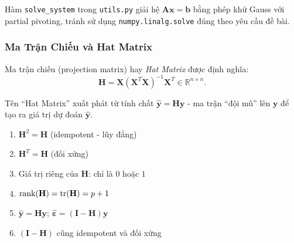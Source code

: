 Hàm \texttt{solve\_system} trong \texttt{utils.py} giải hệ $\mathbf{A}\mathbf{x}
= \mathbf{b}$ bằng phép khử Gauss với partial pivoting, tránh sử dụng
\texttt{numpy.linalg.solve} đúng theo yêu cầu đề bài.

\subsubsection{Ma Trận Chiếu và Hat Matrix}

\begin{tcolorbox}[mycodebox, colback=blue!3!white, colframe=blue!40!black,
    title={\textbf{Định nghĩa 1.2} - Hat Matrix}]
Ma trận chiếu (projection matrix) hay \emph{Hat Matrix} được định nghĩa:
\begin{equation}
    \mathbf{H} = \mathbf{X}(\mathbf{X}^T\mathbf{X})^{-1}\mathbf{X}^T
    \in \mathbb{R}^{n \times n}.
    \label{eq:hat_matrix}
\end{equation}
\end{tcolorbox}

Tên ``Hat Matrix'' xuất phát từ tính chất $\hat{\mathbf{y}} = \mathbf{H}\mathbf{y}$
- ma trận ``đội mũ'' lên $\mathbf{y}$ để tạo ra giá trị dự đoán $\hat{\mathbf{y}}$.

\begin{tcolorbox}[mycodebox, colback=green!3!white, colframe=green!40!black,
    title={\textbf{Mệnh đề 1.1} - Tính Chất của $\mathbf{H}$}]
\begin{enumerate}[label=(\roman*)]
    \item $\mathbf{H}^2 = \mathbf{H}$ \hfill (idempotent - lũy đẳng)
    \item $\mathbf{H}^T = \mathbf{H}$ \hfill (đối xứng)
    \item Giá trị riêng của $\mathbf{H}$: chỉ là $0$ hoặc $1$
    \item $\operatorname{rank}(\mathbf{H}) = \mathrm{tr}(\mathbf{H}) = p+1$
    \item $\hat{\mathbf{y}} = \mathbf{H}\mathbf{y}$;\quad
          $\hat{\boldsymbol{\varepsilon}} = (\mathbf{I} - \mathbf{H})\mathbf{y}$
    \item $(\mathbf{I}-\mathbf{H})$ cũng idempotent và đối xứng
\end{enumerate}
\end{tcolorbox}

